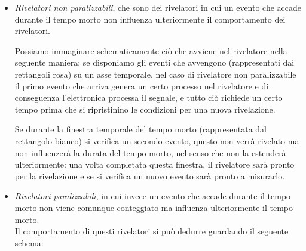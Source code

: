 \begin{itemize}[leftmargin=0.5cm]
   \item \textit{Rivelatori non paralizzabili}, che sono dei rivelatori in cui un evento che accade durante il tempo morto non influenza ulteriormente il comportamento dei rivelatori.
   
   Possiamo immaginare schematicamente ciò che avviene nel rivelatore nella seguente maniera: se disponiamo gli eventi che avvengono (rappresentati dai rettangoli rosa) su un asse temporale, nel caso di rivelatore non paralizzabile il primo evento che arriva genera un certo processo nel rivelatore e di conseguenza l'elettronica processa il segnale, e tutto ciò richiede un certo tempo prima che si ripristinino le condizioni per una nuova rivelazione.
   \begin{figure}[H]
      \centering
   \end{figure}
    Se durante la finestra temporale del tempo morto (rappresentata dal rettangolo bianco) si verifica un secondo evento, questo non verrà rivelato ma non influenzerà la durata del tempo morto, nel senso che non la estenderà ulteriormente: una volta completata questa finestra, il rivelatore sarà pronto per la rivelazione e se si verifica un nuovo evento sarà pronto a misurarlo.

   \item \textit{Rivelatori paralizzabili}, in cui invece un evento che accade durante il tempo morto non viene comunque conteggiato ma influenza ulteriormente il tempo morto.\\
   Il comportamento di questi rivelatori si può dedurre guardando il seguente schema:
   \begin{figure}[H]
      \centering
   \end{figure}
\end{itemize}

